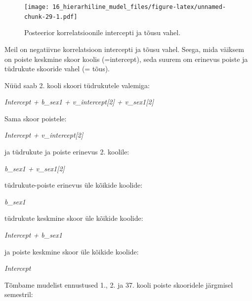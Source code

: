 \documentclass[]{book}
\begin{document}
\begin{figure}
\centering
\texttt{[image: 16\_hierarhiline\_mudel\_files/figure-latex/unnamed-chunk-29-1.pdf]}
\caption{\label{fig:unnamed-chunk-29}Posteerior korrelatsioonile intercepti
ja tõusu vahel.}
\end{figure}

Meil on negatiivne korrelatsioon intercepti ja tõusu vahel. Seega, mida
väiksem on poiste keskmine skoor koolis (=intercept), seda suurem om
erinevus poiste ja tüdrukute skooride vahel (= tõus).

Nüüd saab 2. kooli skoori tüdrukutele valemiga:

\emph{Intercept + b\_sex1 + v\_intercept{[}2{]} + v\_sex1{[}2{]}}

Sama skoor poistele:

\emph{Intercept + v\_intercept{[}2{]}}

ja tüdrukute ja poiste erinevus 2. koolile:

\emph{b\_sex1 + v\_sex1{[}2{]}}

tüdrukute-poiste erinevus üle kõikide koolide:

\emph{b\_sex1}

tüdrukute keskmine skoor üle kõikide koolide:

\emph{Intercept + b\_sex1}

ja poiste keskmine skoor üle kõikide koolide:

\emph{Intercept}

Tõmbame mudelist ennustused 1., 2. ja 37. kooli poiste skooridele
järgmisel semestril:
\end{document}
